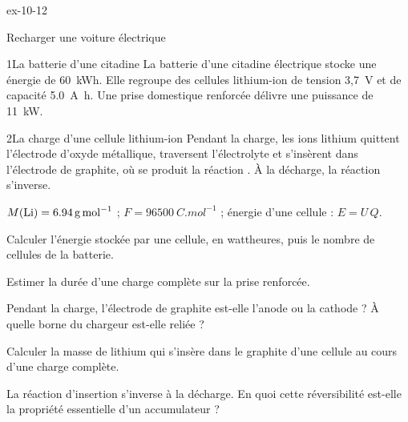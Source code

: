 \begin{blocLivre}{ex-10-12}
\begin{exercice}[3]{Recharger une voiture électrique}
\begin{docu}{1}{La batterie d'une citadine}
La batterie d'une citadine électrique stocke une énergie de 60~kWh. Elle regroupe des cellules lithium-ion de tension
3,7~V et de capacité \qty{5,0}{A.h}. Une prise domestique renforcée délivre une puissance de 11~kW.
\end{docu}
\begin{docu}{2}{La charge d'une cellule lithium-ion}
Pendant la charge, les ions lithium  quittent l'électrode d'oxyde métallique, traversent l'électrolyte et
s'insèrent dans l'électrode de graphite, où se produit la réaction . À la décharge, la
réaction s'inverse.
\end{docu}
\begin{donnees}
$M(\ce{Li})=\qty{6,94}{g.mol^{-1}}$ ; $F=\qty{96500}{C.mol^{-1}}$ ; énergie d'une cellule : $E=U\,Q$.
\end{donnees}
\begin{questions}
\item Calculer l'énergie stockée par une cellule, en wattheures, puis le nombre de cellules de la batterie.
\item Estimer la durée d'une charge complète sur la prise renforcée.
\item Pendant la charge, l'électrode de graphite est-elle l'anode ou la cathode ? À quelle borne du chargeur est-elle
reliée ?
\item \initiative Calculer la masse de lithium qui s'insère dans le graphite d'une cellule au cours d'une charge
complète.
\item La réaction d'insertion s'inverse à la décharge. En quoi cette réversibilité est-elle la propriété essentielle
d'un accumulateur ?
\end{questions}
\end{exercice}
\end{blocLivre}

